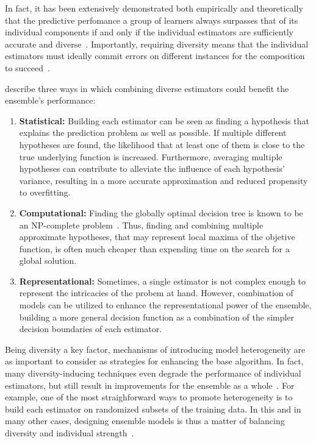 
In fact, it has been extensively demonstrated both empirically and theoretically that the predictive perfomance a group of learners always surpasses that of its individual components if and only if the individual estimators are sufficiently accurate and diverse~\cite{dietterich2000ensemble,breiman2001random,polikar2006ensemble,zhou2019deep}. %
Importantly, requiring diversity means that the individual estimators must ideally commit errors on different instances for the composition to succeed~\cite{polikar2006ensemble}.

 describe three ways in which combining diverse estimators could benefit the ensemble's performance:

\begin{enumerate}
    \item \textbf{Statistical:} Building each estimator can be seen as finding a hypothesis that explains the prediction problem as well as possible. If multiple different hypotheses are found, the likelihood that at least one of them is close to the true underlying function is increased. Furthermore, averaging multiple hypotheses can contribute to alleviate the influence of each hypothesis' variance, resulting in a more accurate approximation and reduced propensity to overfitting.
    \item \textbf{Computational:} Finding the globally optimal decision tree is known to be an NP-complete problem~\cite{hyafil1976constructing}. Thus, finding and combining multiple approximate hypotheses, that may represent local maxima of the objetive function, is often much cheaper than expending time on the search for a global solution. %
    \item \textbf{Representational:} Sometimes, a single estimator is not complex enough to represent the intricacies of the probem at hand. However, combination of models can be utilized to enhance the representational power of the ensemble, building a more general decision function as a combination of the simpler decision boundaries of each estimator.  %
\end{enumerate}

Being diversity a key factor,
mechanisms of introducing model heterogeneity are as important to consider as strategies for enhancing the base algorithm.
%
In fact, many diversity-inducing techniques even degrade the performance of individual estimators, but still result in improvements for the ensemble as a whole~\cite{breiman2001random,geurts2006extremely}.
For example, one of the most straighforward ways to promote heterogeneity is to build each estimator on randomized subsets of the training data.
In this and in many other cases, designing ensemble models is thus a matter of balancing diversity and individual strength~\cite{breiman2001random}.

